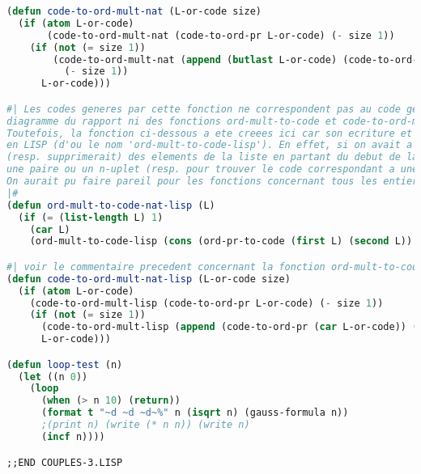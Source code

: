 \documentclass{article}
\begin{document}
\begin{lstlisting}[language=Lisp]
(defun code-to-ord-mult-nat (L-or-code size)
  (if (atom L-or-code)
       (code-to-ord-mult-nat (code-to-ord-pr L-or-code) (- size 1))
    (if (not (= size 1))
        (code-to-ord-mult-nat (append (butlast L-or-code) (code-to-ord-pr (car (last L-or-code))))
          (- size 1))
      L-or-code)))

#| Les codes generes par cette fonction ne correspondent pas au code genere par le
diagramme du rapport ni des fonctions ord-mult-to-code et code-to-ord-mult. 
Toutefois, la fonction ci-dessous a ete creees ici car son ecriture et beaucoup plus idiomatique
en LISP (d'ou le nom 'ord-mult-to-code-lisp'). En effet, si on avait a coder les nombres naturels en LISP, on ajouterait 
(resp. supprimerait) des elements de la liste en partant du debut de la liste afin de creer
une paire ou un n-uplet (resp. pour trouver le code correspondant a une paire ou un n-uplet.
On aurait pu faire pareil pour les fonctions concernant tous les entiers
|#
(defun ord-mult-to-code-nat-lisp (L)
  (if (= (list-length L) 1)
    (car L)
    (ord-mult-to-code-lisp (cons (ord-pr-to-code (first L) (second L)) (cddr L)))))

#| voir le commentaire precedent concernant la fonction ord-mult-to-code-lisp |#
(defun code-to-ord-mult-nat-lisp (L-or-code size)
  (if (atom L-or-code)
    (code-to-ord-mult-lisp (code-to-ord-pr L-or-code) (- size 1))
    (if (not (= size 1))
      (code-to-ord-mult-lisp (append (code-to-ord-pr (car L-or-code)) (cdr L-or-code)) (- size 1))
      L-or-code)))

(defun loop-test (n)
  (let ((n 0))
    (loop
      (when (> n 10) (return))
      (format t "~d ~d ~d~%" n (isqrt n) (gauss-formula n))
      ;(print n) (write (* n n)) (write n)
      (incf n))))

;;END COUPLES-3.LISP

\end{lstlisting}
\end{document}
